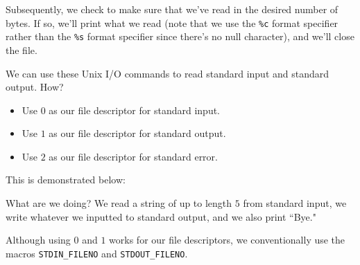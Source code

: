 Subsequently, we check to make sure that we've read in the desired number of bytes. If so, we'll print what we read (note that we use the \verb!%c! format specifier rather than the \verb!%s! format specifier since there's no null character), and we'll close the file. 


We can use these Unix I/O commands to read standard input and standard output. How? \begin{itemize}
    \item Use $0$ as our file descriptor for standard input.
    \item Use $1$ as our file descriptor for standard output.
    \item Use $2$ as our file descriptor for standard error.
\end{itemize}

This is demonstrated below:


\lstset{caption=Unix I/O Example 3}
\begin{center}

\end{center}

What are we doing? We read a string of up to length $5$ from standard input, we write whatever we inputted to standard output, and we also print ``Bye."

Although using $0$ and $1$ works for our file descriptors, we conventionally use the macros \verb!STDIN_FILENO! and \verb!STDOUT_FILENO!.

